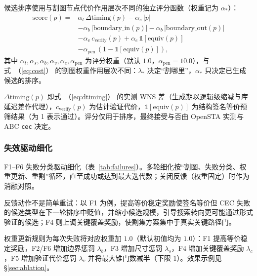 \documentclass[journal]{IEEEtran}
\renewcommand{\eqref}[1]{\textup{（\ref{#1}）}}
\begin{document}
候选排序使用与割图节点代价作用层次不同的独立评分函数（权重记为 $\alpha_*$）：
{\small
\begin{equation}\label{eq:score}
\begin{split}
\mathrm{score}(p) = {}&\alpha_t\,\Delta\mathrm{timing}(p) - \alpha_s\,|p| \\
&- \alpha_b\,|\mathrm{boundary\_in}(p)| - \alpha_b\,|\mathrm{boundary\_out}(p)| \\
&- \alpha_v\,c_{\mathrm{verify}}(p) + \alpha_e\,\mathbb{1}[\mathrm{equiv}(p)] \\
&- \alpha_{\mathrm{pen}}\,(1-\mathbb{1}[\mathrm{equiv}(p)]),
\end{split}
\end{equation}
}
其中 $\alpha_t,\alpha_s,\alpha_b,\alpha_v,\alpha_e,\alpha_{\mathrm{pen}}$ 为评分权重（默认 $1.0$，$\alpha_{\mathrm{pen}}=10.0$），与式~\eqref{eq:cost} 的割图权重作用层次不同：$\lambda_*$ 决定“割哪里”，$\alpha_*$ 只决定已生成候选的排序。

$\Delta\mathrm{timing}(p)$ 即式~\eqref{eq:dtiming} 的实测 WNS 差（生成期以逻辑级缩减与库延迟差作代理），$c_{\mathrm{verify}}(p)$ 为估计验证代价，$\mathbb{1}[\mathrm{equiv}(p)]$ 为结构签名等价预筛结果（为 1 表示通过）。评分仅用于排序，最终接受与否由 OpenSTA 实测与 ABC \texttt{cec} 决定。

\subsubsection{失效驱动细化}
F1--F6 失败分类驱动细化（表~\ref{tab:failures}）。多轮细化按“割图、失败分类、权重更新、重割”循环，直至成功或达到最大迭代数；关闭反馈（权重固定）时作为消融对照。

反馈动作不是简单重试：以 F1 为例，提高等价稳定奖励使签名等价但 CEC 失败的候选类型在下一轮排序中贬值，并缩小候选规模，引导搜索转向更可能通过形式验证的候选；F4 则上调关键覆盖奖励，使割集方案集中于真实关键路径门。

权重更新规则为每次失败将对应权重加 $1.0$（默认初值均为 $1.0$）：F1 提高等价稳定奖励，F2/F6 增加边界惩罚 $\lambda_b$，F3 增加尺寸惩罚 $\lambda_s$，F4 增加关键覆盖奖励 $\lambda_c$，F5 增加验证代价惩罚 $\lambda_v$ 并将最大锥门数减半（下限 1）。效果示例见 \S\ref{sec:ablation}。
\end{document}
